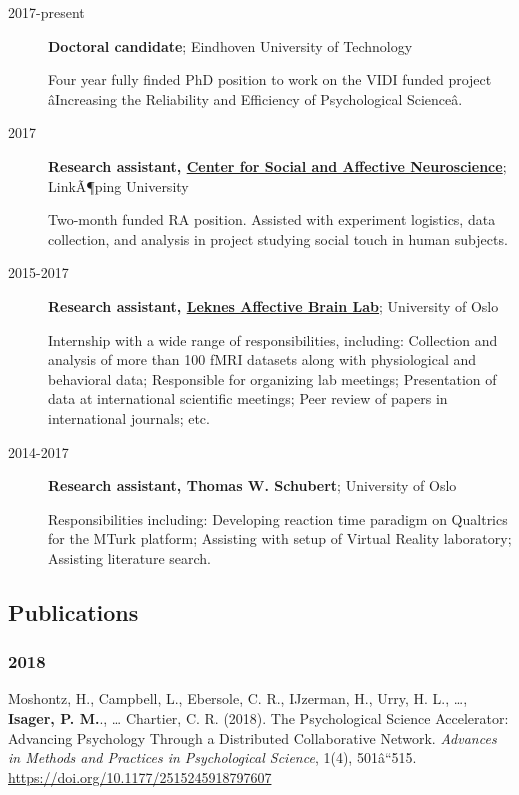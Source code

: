 \documentclass[]{article}
\begin{document}
\begin{description}
\item[2017-present]
\textbf{Doctoral candidate}; Eindhoven University of Technology

Four year fully finded PhD position to work on the VIDI funded project
âIncreasing the Reliability and Efficiency of Psychological
Scienceâ.\\
\item[2017]
\textbf{Research assistant,
\href{https://liu.se/en/organisation/liu/ike/csan}{Center for Social and
Affective Neuroscience}}; LinkÃ¶ping University

Two-month funded RA position. Assisted with experiment logistics, data
collection, and analysis in project studying social touch in human
subjects.\\
\item[2015-2017]
\textbf{Research assistant, \href{https://sirileknes.com/}{Leknes
Affective Brain Lab}}; University of Oslo

Internship with a wide range of responsibilities, including: Collection
and analysis of more than 100 fMRI datasets along with physiological and
behavioral data; Responsible for organizing lab meetings; Presentation
of data at international scientific meetings; Peer review of papers in
international journals; etc.\\
\item[2014-2017]
\textbf{Research assistant, Thomas W. Schubert}; University of Oslo

Responsibilities including: Developing reaction time paradigm on
Qualtrics for the MTurk platform; Assisting with setup of Virtual
Reality laboratory; Assisting literature search.
\end{description}

\subsection{Publications}\label{publications}

\subsubsection{2018}\label{section}

Moshontz, H., Campbell, L., Ebersole, C. R., IJzerman, H., Urry, H. L.,
\ldots{}, \textbf{Isager, P. M.}., \ldots{} Chartier, C. R. (2018). The
Psychological Science Accelerator: Advancing Psychology Through a
Distributed Collaborative Network. \emph{Advances in Methods and
Practices in Psychological Science}, 1(4), 501â``515.
\url{https://doi.org/10.1177/2515245918797607}
\end{document}
